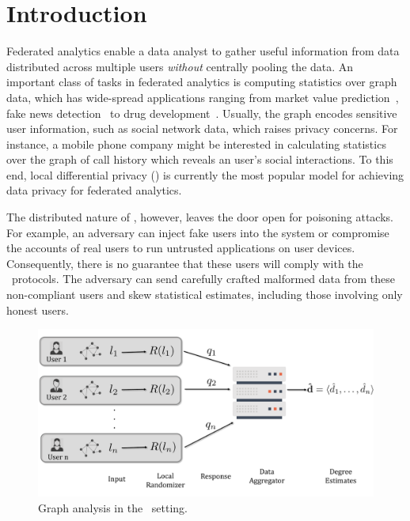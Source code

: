 \section{Introduction}\label{chap4-sec:intro}
 Federated analytics enable a data analyst to gather useful information from data distributed across multiple users \textit{without} centrally pooling the data. An important class of tasks in federated analytics  is computing statistics over graph data, which has wide-spread applications ranging from market value prediction~\cite{matsunaga2019exploring}, fake news detection~\cite{benamira2019semi} to drug development~\cite{gaudelet2021utilizing}.  Usually, the graph encodes sensitive user information, such as social network data, which raises privacy concerns.  For instance, a mobile phone company might be interested in calculating statistics over the graph of call history which reveals an user's social interactions. To this end, local differential privacy (\ldp) is currently the most popular model for achieving data privacy for federated analytics. %


The distributed nature of \ldp, however, leaves the door open for poisoning attacks. For example, an adversary can inject fake users into the system or compromise the accounts of real users to run untrusted applications on user devices. Consequently, there is no guarantee that these users will comply with the \ldp~protocols. The adversary can send carefully crafted malformed data from these non-compliant users and skew statistical estimates, including those involving only honest users. 
\begin{figure}
    \centering
    \includegraphics[width=0.78\columnwidth]{graph_pic_1_new.pdf}
     
  \caption[Graph analysis in the \ldp~setting.]{Graph analysis in the \ldp~setting.}
    \label{chap4-fig:setting}   
    
\end{figure}

